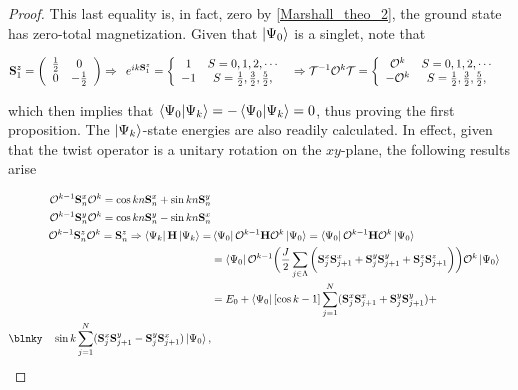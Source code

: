 \documentclass{homework}
\begin{document}
\begin{proof}
This last equality is, in fact, zero by \cref{Marshall_theo_2}, the ground state has zero-total magnetization. Given that $\ket{\Psi_0}$ is a singlet, note that 

\begin{equation}
\begin{split}
    {\bf S}_1^z &= \left(\begin{array}{cc}
        \frac{1}{2} & 0  \\
        0 & -\frac{1}{2} 
    \end{array}\right) \Rightarrow \begin{array}{c}
        e^{ik {\bf S}_1^z}  = \left\{  \begin{array}{cc}
              1 &  S = 0,1,2,\cdots \\
              -1 &  S = \frac{1}{2},\frac{3}{2},\frac{5}{2},
          \end{array} \right.
    \end{array} \Rightarrow \mathcal{T}^{-1} \mathcal{O}^{k} \mathcal{T} = \left\{  \begin{array}{cc}
              \mathcal{O}^{k} &  S = 0,1,2,\cdots \\
              -\mathcal{O}^{k} &  S = \frac{1}{2},\frac{3}{2},\frac{5}{2},
          \end{array} \right.
\end{split}
\end{equation}

which then implies that $\bra{\Psi_0} \ket{\Psi_k} = - \bra{\Psi_0} \ket{\Psi_k} = 0$, thus proving the first proposition. The $\ket{\Psi_k}$-state energies are also readily calculated. In effect, given that the twist operator is a unitary rotation on the $xy$-plane, the following results arise 

\begin{equation}
\begin{split}
     \mathcal{O}^{k-1} \spin^x_n \mathcal{O}^{k} = \cos kn \spin_n^x + \sin kn \spin_n^y  \\
     \mathcal{O}^{k-1} \spin^y_n \mathcal{O}^{k} = \cos kn \spin_n^y - \sin kn \spin_n^x  \\
     \mathcal{O}^{k-1} \spin^z_n \mathcal{O}^{k} = \spin^z_n \Rightarrow \bra{\Psi_k} {{\bf H}} \ket{\Psi_k} =& \bra{\Psi_0} \mathcal{O}^{k-1} {{\bf H}} \mathcal{O}^{k} \ket{\Psi_0} = \bra{\Psi_0} \mathcal{O}^{k-1} {{\bf H}} \mathcal{O}^{k} \ket{\Psi_0} \\
     &= \bra{\Psi_0} \mathcal{O}^{k-1} \bigg( \frac{J}{2} \sum_{j \in \Lambda} \bigg(\spin_j^x \spin_{j+1}^x + \spin_j^y \spin_{j+1}^y + \spin_j^z \spin_{j+1}^z \bigg) \bigg) \mathcal{O}^{k} \ket{\Psi_0} \\
     &= E_0 + \bra{\Psi_0} [\cos k - 1] \sum_{j=1}^N (\spin_j^x \spin_{j+1}^x + \spin_j^y \spin_{j+1}^y) + \\
     \blnky \blanky \blanky \blanky \sin k \sum_{j=1}^N (\spin_j^x \spin_{j+1}^y - \spin_j^y \spin_{j+1}^x) \ket{\Psi_0}, 
\end{split} 
\end{equation}


\end{proof}
\end{document}
